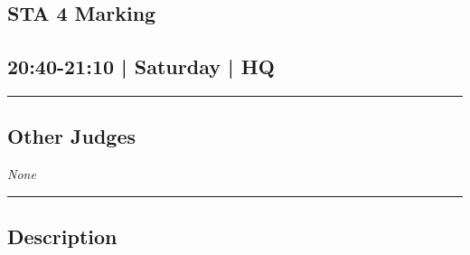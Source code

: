 \documentclass[10pt, A5]{article}
\begin{document}
		\begin{framed}
			\begin{minipage}{\textwidth}

			\setcounter{section}{83}
							\section{STA 4 Marking}
						
			\subsection*{20:40-21:10 | Saturday | HQ}

			\vspace{0.25cm}
			\hrule
			\vspace{0.25cm}


			\subsection*{Other Judges}
						\textit{None}

					\vspace{0.25cm}
			\hrule
			\vspace{0.25cm}

			\begin{minipage}{\textwidth}
			\subsection*{\faListAlt \: Description}
			
			\end{minipage}


	\end{minipage}
	\end{framed}

	
\end{document}
